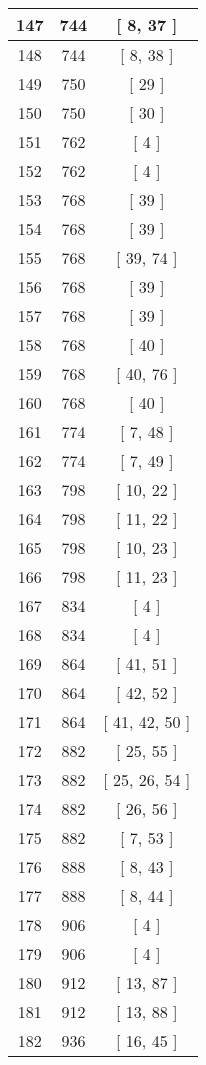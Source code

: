 \begin{center}
\begin{longtable}[H]{|| c c c ||}
\hline
147 & 744 & [ 8, 37 ] \\ 
\hline
148 & 744 & [ 8, 38 ] \\ 
\hline
149 & 750 & [ 29 ] \\ 
\hline
150 & 750 & [ 30 ] \\ 
\hline
151 & 762 & [ 4 ] \\ 
\hline
152 & 762 & [ 4 ] \\ 
\hline
153 & 768 & [ 39 ] \\ 
\hline
154 & 768 & [ 39 ] \\ 
\hline
155 & 768 & [ 39, 74 ] \\ 
\hline
156 & 768 & [ 39 ] \\ 
\hline
157 & 768 & [ 39 ] \\ 
\hline
158 & 768 & [ 40 ] \\ 
\hline
159 & 768 & [ 40, 76 ] \\ 
\hline
160 & 768 & [ 40 ] \\ 
\hline
161 & 774 & [ 7, 48 ] \\ 
\hline
162 & 774 & [ 7, 49 ] \\ 
\hline
163 & 798 & [ 10, 22 ] \\ 
\hline
164 & 798 & [ 11, 22 ] \\ 
\hline
165 & 798 & [ 10, 23 ] \\ 
\hline
166 & 798 & [ 11, 23 ] \\ 
\hline
167 & 834 & [ 4 ] \\ 
\hline
168 & 834 & [ 4 ] \\ 
\hline
169 & 864 & [ 41, 51 ] \\ 
\hline
170 & 864 & [ 42, 52 ] \\ 
\hline
171 & 864 & [ 41, 42, 50 ] \\ 
\hline
172 & 882 & [ 25, 55 ] \\ 
\hline
173 & 882 & [ 25, 26, 54 ] \\ 
\hline
174 & 882 & [ 26, 56 ] \\ 
\hline
175 & 882 & [ 7, 53 ] \\ 
\hline
176 & 888 & [ 8, 43 ] \\ 
\hline
177 & 888 & [ 8, 44 ] \\ 
\hline
178 & 906 & [ 4 ] \\ 
\hline
179 & 906 & [ 4 ] \\ 
\hline
180 & 912 & [ 13, 87 ] \\ 
\hline
181 & 912 & [ 13, 88 ] \\ 
\hline
182 & 936 & [ 16, 45 ] \\ 

\end{longtable}
\end{center}
